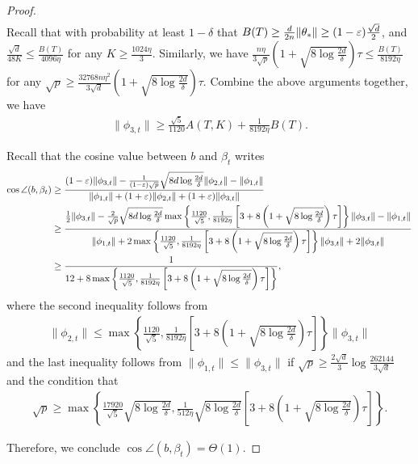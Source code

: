 \begin{proof}
\begin{align*}
    \end{align*}
    Recall that with probability at least $1-\delta$ that $B(T) \geq \frac{d}{2n}\|\theta_*\| \geq (1-\varepsilon)\frac{\sqrt{d}}{2}$, and $\frac{\sqrt{d}}{48K} \leq \frac{B(T)}{4096\eta}$ for any $K \geq \frac{1024\eta}{3}$. Similarly, we have $\frac{n\eta}{3\sqrt{p}} \left(1 + \sqrt{8\log\frac{2d}{\delta}}\right) \tau \leq \frac{B(T)}{8192\eta}$ for any $\sqrt{p} \geq \frac{32768n\eta^2}{3\sqrt{d}}\left(1 + \sqrt{8\log\frac{2d}{\delta}}\right)\tau$.
    Combine the above arguments together, we have 
    \begin{align*}
        \|\phi_{3,t}\| \geq \frac{\sqrt{5}}{1120} A(T,K) + \frac{1}{8192\eta} B(T).
    \end{align*}
    
    Recall that the cosine value between $b$ and $\beta_t$ writes
    \begin{align*}
        \cos\angle(b, \beta_t) & \geq \frac{(1-\varepsilon)\|\phi_{3,t}\|-\frac{1}{(1-\varepsilon)\sqrt{p}} \sqrt{8d\log\frac{2d}{\delta}} \|\phi_{2,t}\| - \|\phi_{1,t}\|}{\|\phi_{1,t}\|+(1+\varepsilon)\|\phi_{2,t}\|+(1+\varepsilon)\|\phi_{3,t}\|} \\
        & \geq \frac{\frac{1}{2}\|\phi_{3,t}\|-\frac{2}{\sqrt{p}} \sqrt{8d\log\frac{2d}{\delta}} \max\left\{ \frac{1120}{\sqrt{5}}, \frac{1}{8192\eta} \left[ 3 + 8\left(1 + \sqrt{8\log\frac{2d}{\delta}}\right)\tau \right] \right\} \|\phi_{3,t}\| - \|\phi_{1,t}\|}{\|\phi_{1,t}\|+2\max\left\{ \frac{1120}{\sqrt{5}}, \frac{1}{8192\eta} \left[ 3 + 8\left(1 + \sqrt{8\log\frac{2d}{\delta}}\right)\tau \right] \right\} \|\phi_{3,t}\| + 2\|\phi_{3,t}\|} \\
        & \geq \frac{1}{12 + 8 \max\left\{ \frac{1120}{\sqrt{5}}, \frac{1}{8192\eta} \left[ 3 + 8\left(1 + \sqrt{8\log\frac{2d}{\delta}}\right)\tau \right] \right\}},
    \end{align*}
    where the second inequality follows from 
    \begin{align*}
        \|\phi_{2,t}\| \leq \max\left\{ \frac{1120}{\sqrt{5}}, \frac{1}{8192\eta} \left[ 3 + 8\left(1 + \sqrt{8\log\frac{2d}{\delta}}\right)\tau \right] \right\} \|\phi_{3,t}\|
    \end{align*}
    and the last inequality follows from $\|\phi_{1,t}\| \leq \|\phi_{3,t}\|$ if $\sqrt{p} \geq \frac{2\sqrt{d}}{3}\log\frac{262144}{3\sqrt{d}}$ and the condition that
    \begin{align*}
        \sqrt{p} \geq \max\left\{ \frac{17920}{\sqrt{5}}\sqrt{8\log\frac{2d}{\delta}}, \frac{1}{512\eta} \sqrt{8\log\frac{2d}{\delta}} \left[ 3 + 8\left(1 + \sqrt{8\log\frac{2d}{\delta}}\right)\tau \right] \right\}.
    \end{align*}
    
    Therefore, we conclude $\cos\angle(b, \beta_t) = \Theta(1)$.
\end{proof}

